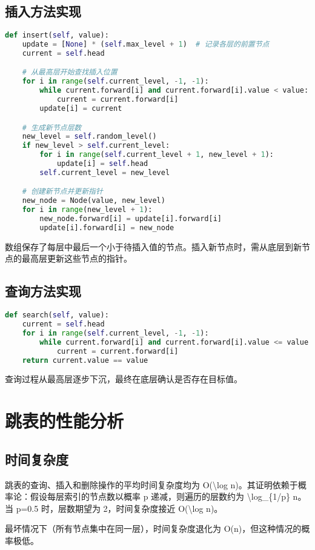 \section{插入方法实现}
\begin{lstlisting}[language=python]
def insert(self, value):  
    update = [None] * (self.max_level + 1)  # 记录各层的前置节点  
    current = self.head  

    # 从最高层开始查找插入位置  
    for i in range(self.current_level, -1, -1):  
        while current.forward[i] and current.forward[i].value < value:  
            current = current.forward[i]  
        update[i] = current  

    # 生成新节点层数  
    new_level = self.random_level()  
    if new_level > self.current_level:  
        for i in range(self.current_level + 1, new_level + 1):  
            update[i] = self.head  
        self.current_level = new_level  

    # 创建新节点并更新指针  
    new_node = Node(value, new_level)  
    for i in range(new_level + 1):  
        new_node.forward[i] = update[i].forward[i]  
        update[i].forward[i] = new_node  
\end{lstlisting}
 数组保存了每层中最后一个小于待插入值的节点。插入新节点时，需从底层到新节点的最高层更新这些节点的指针。\par
\section{查询方法实现}
\begin{lstlisting}[language=python]
def search(self, value):  
    current = self.head  
    for i in range(self.current_level, -1, -1):  
        while current.forward[i] and current.forward[i].value <= value:  
            current = current.forward[i]  
    return current.value == value  
\end{lstlisting}
查询过程从最高层逐步下沉，最终在底层确认是否存在目标值。\par
\chapter{跳表的性能分析}
\section{时间复杂度}
跳表的查询、插入和删除操作的平均时间复杂度均为 O(\textbackslash{}log n)。其证明依赖于概率论：假设每层索引的节点数以概率 p 递减，则遍历的层数约为 \textbackslash{}log\_{}\{{}1/p\}{} n。当 p=0.5 时，层数期望为 2，时间复杂度接近 O(\textbackslash{}log n)。\par
最坏情况下（所有节点集中在同一层），时间复杂度退化为 O(n)，但这种情况的概率极低。\par
